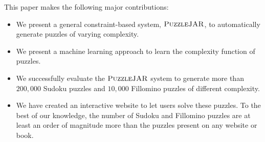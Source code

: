 This paper makes the following major contributions:

\begin{itemize}
\item We present a general constraint-based system, $\textsc{PuzzleJAR}$, to automatically generate puzzles of varying complexity.
\item We present a machine learning approach to learn the
  complexity function of puzzles.
\item We successfully evaluate the $\textsc{PuzzleJAR}$ system to generate
  more than $200,000$ Sudoku puzzles and $10,000$ Fillomino puzzles of
  different complexity.
\item We have created an interactive website to let users solve these
  puzzles. To the best of our knowledge, the number of Sudoku and
  Fillomino puzzles are at least an order of magnitude more than the
  puzzles present on any website or book.
\end{itemize}
